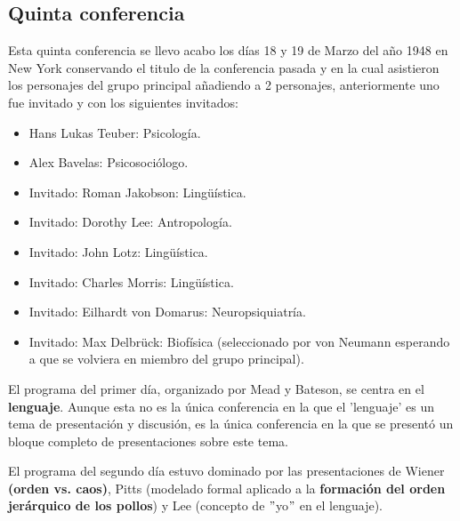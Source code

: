 \documentclass[11pt]{article}
\begin{document}
		\subsection{Quinta conferencia}
		Esta quinta conferencia se llevo acabo los días 18 y 19 de Marzo del año 1948 en New York conservando el titulo de la conferencia pasada y en la cual asistieron los personajes del grupo principal añadiendo a 2 personajes, anteriormente uno fue invitado y con los siguientes invitados:
		\begin{itemize}
    		\item Hans Lukas Teuber: Psicología.
    		\item Alex Bavelas: Psicosociólogo.
			\item Invitado: Roman Jakobson: Lingüística.
			\item Invitado: Dorothy Lee: Antropología.
			\item Invitado: John Lotz: Lingüística.
			\item Invitado: Charles Morris: Lingüística.
			\item Invitado: Eilhardt von Domarus: Neuropsiquiatría.
			\item Invitado: Max Delbrück: Biofísica (seleccionado por von Neumann esperando a que se volviera en miembro del grupo principal).
		\end{itemize}
 		El programa del primer día, organizado por Mead y Bateson, se centra en el \textbf{lenguaje}. Aunque esta no es la única conferencia en la que el 'lenguaje' es un tema de presentación y discusión, es la única conferencia en la que se presentó un bloque completo de presentaciones sobre este tema.\par
		El programa del segundo día estuvo dominado por las presentaciones de Wiener \textbf{(orden vs. caos)}, Pitts (modelado formal aplicado a la \textbf{formación del orden jerárquico de los pollos}) y Lee (concepto de $"$yo$"$ en el lenguaje).\par
\end{document}
